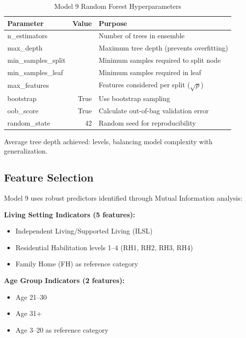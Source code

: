 \begin{table}[h]
\centering
\caption{Model 9 Random Forest Hyperparameters}
\begin{tabular}{lrl}
\toprule
\textbf{Parameter} & \textbf{Value} & \textbf{Purpose} \\
\midrule
n\_estimators & \ModelNineNTrees{} & Number of trees in ensemble \\
max\_depth & \ModelNineMaxDepth{} & Maximum tree depth (prevents overfitting) \\
min\_samples\_split & \ModelNineMinSamplesSplit{} & Minimum samples required to split node \\
min\_samples\_leaf & \ModelNineMinSamplesLeaf{} & Minimum samples required in leaf \\
max\_features & \ModelNineMaxFeatures{} & Features considered per split ($\sqrt{p}$) \\
bootstrap & True & Use bootstrap sampling \\
oob\_score & True & Calculate out-of-bag validation error \\
random\_state & 42 & Random seed for reproducibility \\
\bottomrule
\end{tabular}
\label{tab:model9_hyperparams}
\end{table}

Average tree depth achieved: \ModelNineAvgTreeDepth{} levels, balancing model complexity with generalization.

\subsection{Feature Selection}

Model 9 uses \ModelNineNumFeatures{} robust predictors identified through Mutual Information analysis:

\textbf{Living Setting Indicators (5 features):}
\begin{itemize}
    \item Independent Living/Supported Living (ILSL)
    \item Residential Habilitation levels 1--4 (RH1, RH2, RH3, RH4)
    \item Family Home (FH) as reference category
\end{itemize}

\textbf{Age Group Indicators (2 features):}
\begin{itemize}
    \item Age 21--30
    \item Age 31+
    \item Age 3--20 as reference category
\end{itemize}

